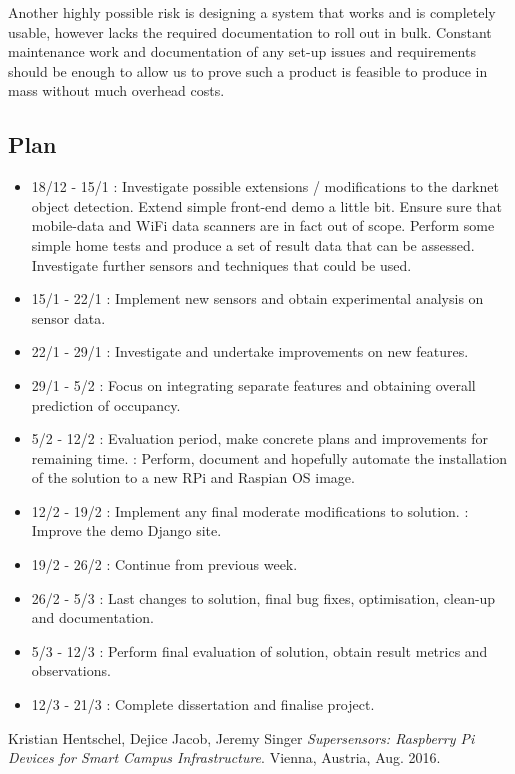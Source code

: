 \documentclass[11pt]{article}
\begin{document}
Another highly possible risk is designing a system that works and is completely usable, however lacks the required documentation to roll out in bulk. Constant maintenance work and documentation of any set-up issues and requirements should be enough to allow us to prove such a product is feasible to produce in mass without much overhead costs.

\subsection{Plan}\label{plan}
\begin{itemize}
  \item 18/12 - 15/1 : Investigate possible extensions / modifications to the darknet object detection. Extend simple front-end demo a little bit. Ensure sure that mobile-data and WiFi data scanners are in fact out of scope. Perform some simple home tests and produce a set of result data that can be assessed. Investigate further sensors and techniques that could be used.
  \item 15/1 - 22/1 : Implement new sensors and obtain experimental analysis on sensor data.
  \item 22/1 - 29/1 : Investigate and undertake improvements on new features.
  \item 29/1 - 5/2 : Focus on integrating separate features and obtaining overall prediction of occupancy.
  \item 5/2 - 12/2 : Evaluation period, make concrete plans and improvements for remaining time. : Perform, document and hopefully automate the installation of the solution to a new RPi and Raspian OS image.
  \item 12/2 - 19/2 : Implement any final moderate modifications to solution. : Improve the demo Django site.
  \item 19/2 - 26/2 : Continue from previous week.
  \item 26/2 - 5/3 : Last changes to solution, final bug fixes, optimisation, clean-up and documentation.
  \item 5/3 - 12/3 : Perform final evaluation of solution, obtain result metrics and observations.
  \item 12/3 - 21/3 : Complete dissertation and finalise project.
\end{itemize}


\begin{thebibliography}{9}
Kristian Hentschel, Dejice Jacob, Jeremy Singer 
\textit{ Supersensors: Raspberry Pi Devices for Smart Campus Infrastructure}. 
Vienna, Austria, Aug. 2016.
\end{thebibliography}
\end{document}
